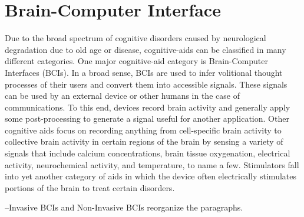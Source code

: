 \section{Brain-Computer Interface}
Due to the broad spectrum of cognitive disorders caused by neurological degradation due to old age or disease, cognitive-aids can be classified in many different categories. One major cognitive-aid category is Brain-Computer Interfaces (BCIs). In a broad sense, BCIs are used to infer volitional thought processes of their users and convert them into accessible signals. These signals can be used by an external device or other humans in the case of communications. To this end, devices record brain activity and generally apply some post-processing to generate a signal useful for another application. Other cognitive aids focus on recording anything from cell-specific brain activity to collective brain activity in certain regions of the brain by sensing a variety of signals that include calcium concentrations, brain tissue oxygenation, electrical activity, neurochemical activity, and temperature, to name a few. Stimulators fall into yet another category of aids in which the device often electrically stimulates portions of the brain to treat certain disorders. 

--Invasive BCIs and Non-Invasive BCIs reorganize the paragraphs.

